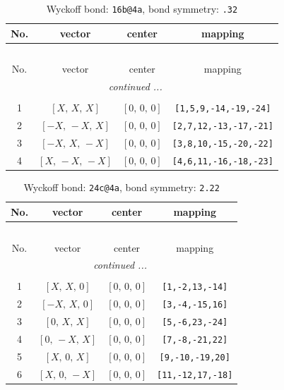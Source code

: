 \documentclass[fleqn,8pt]{jsarticle}
\begin{document}
\begin{longtable}{cccc}
\caption{Wyckoff bond: {\tt 16b@4a}, bond symmetry: {\tt .32}}
 \\
 \hline \hline
No. & vector & center & mapping \\ \hline \endfirsthead

\multicolumn{3}{l}{\tablename\ \thetable{}} \\
 \hline \hline
No. & vector & center & mapping \\ \hline \endhead

 \hline \hline
\multicolumn{3}{r}{\footnotesize\it continued ...} \\ \endfoot

 \hline \hline
\multicolumn{3}{r}{} \\ \endlastfoot

1 & $\left[ X,\, X,\, X \right]$ & $\left[ 0,\, 0,\, 0 \right]$ & {\tt [1,5,9,-14,-19,-24]} \\ \hline
2 & $\left[ - X,\, - X,\, X \right]$ & $\left[ 0,\, 0,\, 0 \right]$ & {\tt [2,7,12,-13,-17,-21]} \\ \hline
3 & $\left[ - X,\, X,\, - X \right]$ & $\left[ 0,\, 0,\, 0 \right]$ & {\tt [3,8,10,-15,-20,-22]} \\ \hline
4 & $\left[ X,\, - X,\, - X \right]$ & $\left[ 0,\, 0,\, 0 \right]$ & {\tt [4,6,11,-16,-18,-23]} \\
\end{longtable}
\renewcommand{\arraystretch}{1.2}
\begin{longtable}{cccc}
\caption{Wyckoff bond: {\tt 24c@4a}, bond symmetry: {\tt 2.22}}
 \\
 \hline \hline
No. & vector & center & mapping \\ \hline \endfirsthead

\multicolumn{3}{l}{\tablename\ \thetable{}} \\
 \hline \hline
No. & vector & center & mapping \\ \hline \endhead

 \hline \hline
\multicolumn{3}{r}{\footnotesize\it continued ...} \\ \endfoot

 \hline \hline
\multicolumn{3}{r}{} \\ \endlastfoot

1 & $\left[ X,\, X,\, 0 \right]$ & $\left[ 0,\, 0,\, 0 \right]$ & {\tt [1,-2,13,-14]} \\ \hline
2 & $\left[ - X,\, X,\, 0 \right]$ & $\left[ 0,\, 0,\, 0 \right]$ & {\tt [3,-4,-15,16]} \\ \hline
3 & $\left[ 0,\, X,\, X \right]$ & $\left[ 0,\, 0,\, 0 \right]$ & {\tt [5,-6,23,-24]} \\ \hline
4 & $\left[ 0,\, - X,\, X \right]$ & $\left[ 0,\, 0,\, 0 \right]$ & {\tt [7,-8,-21,22]} \\ \hline
5 & $\left[ X,\, 0,\, X \right]$ & $\left[ 0,\, 0,\, 0 \right]$ & {\tt [9,-10,-19,20]} \\ \hline
6 & $\left[ X,\, 0,\, - X \right]$ & $\left[ 0,\, 0,\, 0 \right]$ & {\tt [11,-12,17,-18]} \\
\end{longtable}
\end{document}
